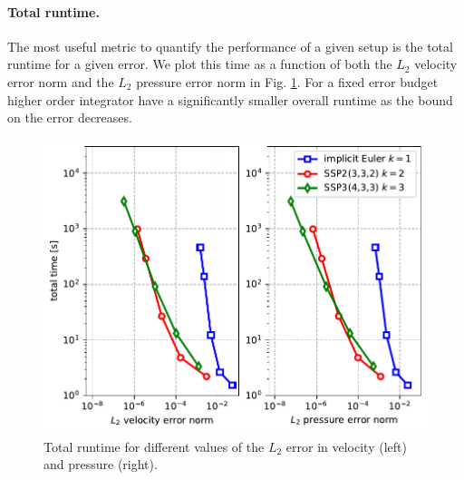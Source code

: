 \documentclass[11pt]{article}
\begin{document}
\paragraph{Total runtime.}
The most useful metric to quantify the performance of a given setup is the total runtime for a given error. We plot this time as a function of both the $L_2$ velocity error norm and the $L_2$ pressure error norm in Fig. \ref{fig:ttotal}. For a fixed error budget higher order integrator have a significantly smaller overall runtime as the bound on the error decreases.
\begin{figure}
    \begin{center}
        \includegraphics[width=0.75\linewidth]{figures/ttotal.pdf}
        \caption{Total runtime for different values of the $L_2$ error in velocity (left) and pressure (right).}
        \label{fig:ttotal}
    \end{center}
\end{figure}
\clearpage
\appendix
\end{document}
